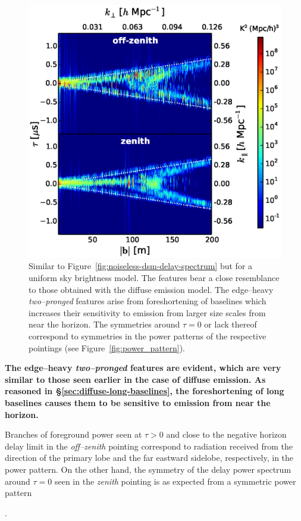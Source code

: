 \documentclass[preprint2,iop,numberedappendix]{emulateapj}
\begin{document}
\begin{figure}[htb]
\centering
\includegraphics[width=\linewidth]{fig14.eps}
\caption{Similar to Figure~\ref{fig:noiseless-dsm-delay-spectrum} but for a uniform sky brightness model. The features bear a close resemblance to those obtained with the diffuse emission model. The edge--heavy {\it two--pronged} features arise from foreshortening of baselines which increases their sensitivity to emission from larger size scales from near the horizon. The symmetries around $\tau=0$ or lack thereof correspond to symmetries in the power patterns of the respective pointings (see Figure~\ref{fig:power_pattern}). \label{fig:noiseless-usm-delay-spectrum}}
\end{figure}

{\bf The edge--heavy {\it two--pronged} features are evident, which are very similar to those seen earlier in the case of diffuse emission. As reasoned in \S\ref{sec:diffuse-long-baselines}, the foreshortening of long baselines causes them to be sensitive to emission from near the horizon. 

Branches of foreground power seen at $\tau>0$ and close to the negative horizon delay limit in the {\it off--zenith} pointing correspond to radiation received from the direction of the primary lobe and the far eastward sidelobe, respectively, in the power pattern. On the other hand, the symmetry of the delay power spectrum around $\tau=0$ seen in the {\it zenith} pointing is as expected from a symmetric power pattern}.
\end{document}
